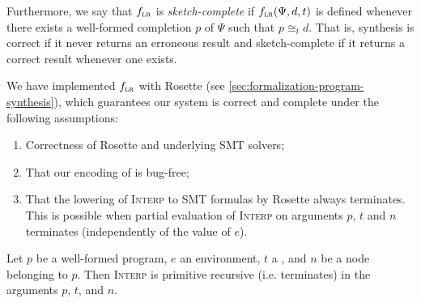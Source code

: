 Furthermore, we say
  that $\text{$f_{\textsc{lr}}$}$ is
  \emph{sketch-complete}
  if $\text{$f_{\textsc{lr}}$}(\Psi,d,t)$
  is defined whenever
  there exists a
  well-formed completion
  $p$ of $\Psi$
  such that $p\cong_t d$.
That is, synthesis is
  correct if it never
  returns an erroneous result
  and sketch-complete
  if it returns a
  correct result
  whenever one exists.

{%
We have implemented $\text{$f_{\textsc{lr}}$}$
    with Rosette 
    (see \cref{sec:formalization-program-synthesis}),
    which guarantees our system is correct and complete
    under the following assumptions:
\begin{enumerate}
    \item Correctness of Rosette and underlying SMT solvers;
    \item That our encoding of \lr{} is bug-free;
    \item That the lowering of \textsc{Interp}
    to SMT formulas by  Rosette always terminates.
    This is possible when partial evaluation of \textsc{Interp} on arguments $p$, $t$ and $n$ terminates (independently of the value of $e$).
\end{enumerate}

}

\begin{lemma}
\label{lemma:interp-is-primitive-recursive}
Let $p$ be a well-formed program, 
    $e$ an environment,
    $t$ a \Time,
    and $n$ be a node belonging to $p$.
Then \textsc{Interp} is primitive recursive 
    (i.e. terminates) in the arguments $p$, $t$, and $n$.\tighten
\end{lemma}

